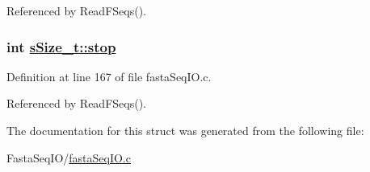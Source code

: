 Referenced by Read\-FSeqs().\hypertarget{structsSize__t_o1}{
\subsubsection[stop]{\setlength{\rightskip}{0pt plus 5cm}int \hyperlink{structsSize__t_o1}{s\-Size\_\-t::stop}}}
\label{structsSize__t_o1}




Definition at line 167 of file fasta\-Seq\-IO.c.

Referenced by Read\-FSeqs().

The documentation for this struct was generated from the following file:\begin{CompactItemize}
\item 
Fasta\-Seq\-IO/\hyperlink{fastaSeqIO_8c}{fasta\-Seq\-IO.c}\end{CompactItemize}
